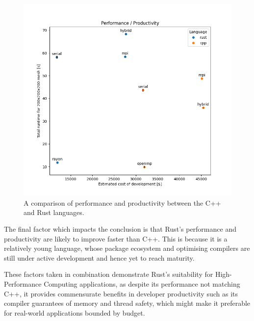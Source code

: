 \begin{figure}[H]
    \centering
    \includegraphics[width=\textwidth]{images/7_conclusions/performance_productivity.png}
    \caption{A comparison of performance and productivity between the C++ and Rust languages.}
    \label{fig:conclusions_performance_productivity}
\end{figure}


The final factor which impacts the conclusion is that Rust's performance and productivity are likely to improve faster than C++. This is because it is a relatively young language, whose package ecosystem and optimising compilers are still under active development and hence yet to reach maturity.

These factors taken in combination demonstrate Rust's suitability for High-Performance Computing applications, as despite its performance not matching C++, it provides commensurate benefits in developer productivity such as its compiler guarantees of memory and thread safety, which might make it preferable for real-world applications bounded by budget.


